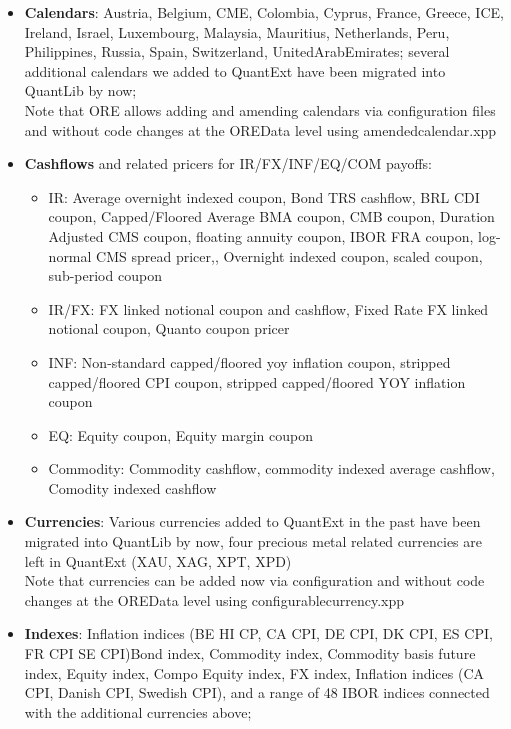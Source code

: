 \documentclass[12pt, a4paper]{report}
\begin{document}
\begin{itemize}
\item {\bf Calendars}: Austria, Belgium, CME, Colombia, Cyprus, France, Greece, ICE, Ireland, Israel, Luxembourg, Malaysia, Mauritius, Netherlands, Peru, Philippines, Russia, Spain, Switzerland, UnitedArabEmirates; several additional calendars we added to QuantExt have been migrated into QuantLib by now; \\
  {\color{red}Note that ORE allows adding and amending calendars via configuration files and without code changes at the OREData level using amendedcalendar.xpp}
\item {\bf Cashflows} and related pricers for IR/FX/INF/EQ/COM payoffs:
  \begin{itemize}
  \item IR: Average overnight indexed coupon, Bond TRS cashflow, BRL CDI coupon, Capped/Floored Average BMA coupon, CMB coupon, Duration Adjusted CMS coupon, floating annuity coupon, IBOR FRA coupon, log-normal CMS spread pricer,, Overnight indexed coupon, scaled coupon, sub-period coupon
  \item IR/FX: FX linked notional coupon and cashflow, Fixed Rate FX linked notional coupon, Quanto coupon pricer
    \item INF: Non-standard capped/floored yoy inflation coupon, stripped capped/floored CPI coupon, stripped capped/floored YOY inflation coupon
  \item EQ: Equity coupon, Equity margin coupon
  \item Commodity: Commodity cashflow, commodity indexed average cashflow, Comodity indexed cashflow
  \end{itemize}
\item {\bf Currencies}: Various currencies added to QuantExt in the past have been migrated into QuantLib by now, four precious metal related currencies are left in QuantExt (XAU, XAG, XPT, XPD) \\
  {\color{red}Note that currencies can be added now via configuration and without code changes at the OREData level using configurablecurrency.xpp}
\item {\bf Indexes}: Inflation indices (BE HI CP, CA CPI, DE CPI, DK CPI, ES CPI, FR CPI SE CPI)Bond index, Commodity index, Commodity basis future index, Equity index, Compo Equity index, FX index, Inflation indices (CA CPI, Danish CPI, Swedish CPI), and a range of 48 IBOR indices connected with the additional currencies above;\\

\end{itemize}
\end{document}
